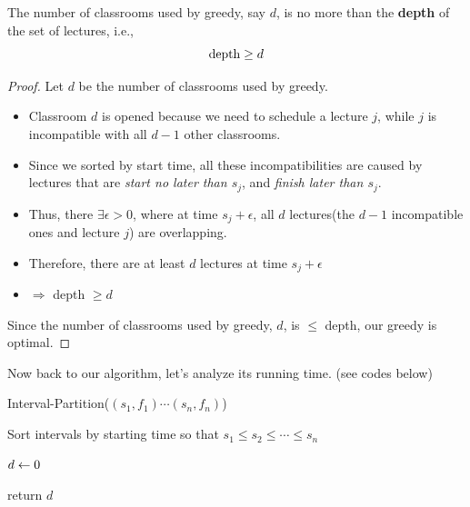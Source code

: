 \begin{spacing}{1.3}
    \begin{theorem}
        The number of classrooms used by greedy, say $d$, is no more than 
        the {\bf depth} of the set of lectures, i.e., $${\rm depth} \ge d$$
    \end{theorem}

    \begin{proof}
        Let $d$ be the number of classrooms used by greedy.
        \begin{itemize}
            \item Classroom $d$ is opened because we need to schedule a lecture $j$, 
            while $j$ is incompatible with all $d-1$ other classrooms.
            \item Since we sorted by start time, all these incompatibilities are caused 
            by lectures that are {\it start no later than $s_j$}, and 
            {\it finish later than $s_j$}.
            \item Thus, there $\exists \epsilon > 0$, where at time $s_j+\epsilon$,
            all $d$ lectures(the $d-1$ incompatible ones and lecture $j$) are overlapping. 
            \item Therefore, there are at least $d$ lectures at time $s_j+\epsilon$
            \item $\Rightarrow $ depth $\ge d$ 
        \end{itemize}
        Since the number of classrooms used by greedy, $d$, is $\le $ depth,
        our greedy is optimal.
    \end{proof}

    Now back to our algorithm, let's analyze its running time. (see codes below)

    \begin{algorithm*}[htbp]
        \caption{Interval-Partition($(s_1,f_1)\cdots (s_n, f_n)$)}
        Sort intervals by starting time so that $s_1\le s_2\le \cdots \le s_n$

        $d\leftarrow 0$\quad {}

        return $d$
    \end{algorithm*}


\end{spacing}
